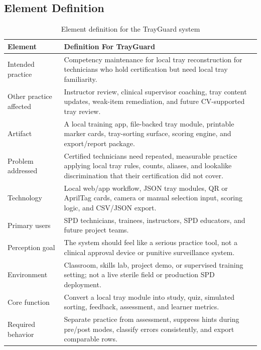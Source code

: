 \documentclass[10pt,a4paper]{article}
\begin{document}
\subsection{Element Definition}


\begin{table}[H]
\centering
\caption{Element definition for the TrayGuard system}
\label{tab:element-definition-for-the-trayguard-system}
\small\renewcommand{\arraystretch}{1.2}\setlength{\tabcolsep}{4pt}
\begin{tabularx}{\textwidth}{|>{\raggedright\arraybackslash}X|>{\raggedright\arraybackslash}X|}
\hline
Element & Definition For TrayGuard \\
\hline
Intended practice & Competency maintenance for local tray reconstruction for technicians who hold certification but need local tray familiarity. \\
\hline
Other practice affected & Instructor review, clinical supervisor coaching, tray content updates, weak-item remediation, and future CV-supported tray review. \\
\hline
Artifact & A local training app, file-backed tray module, printable marker cards, tray-sorting surface, scoring engine, and export/report package. \\
\hline
Problem addressed & Certified technicians need repeated, measurable practice applying local tray rules, counts, aliases, and lookalike discrimination that their certification did not cover. \\
\hline
Technology & Local web/app workflow, JSON tray modules, QR or AprilTag cards, camera or manual selection input, scoring logic, and CSV/JSON export. \\
\hline
Primary users & SPD technicians, trainees, instructors, SPD educators, and future project teams. \\
\hline
Perception goal & The system should feel like a serious practice tool, not a clinical approval device or punitive surveillance system. \\
\hline
Environment & Classroom, skills lab, project demo, or supervised training setting; not a live sterile field or production SPD deployment. \\
\hline
Core function & Convert a local tray module into study, quiz, simulated sorting, feedback, assessment, and learner metrics. \\
\hline
Required behavior & Separate practice from assessment, suppress hints during pre/post modes, classify errors consistently, and export comparable rows. \\

\end{tabularx}
\end{table}
\end{document}

